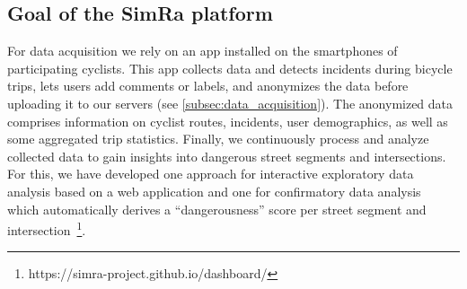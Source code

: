 \subsection{Goal of the SimRa platform}
\label{subsec:simra}

For data acquisition we rely on an app installed on the smartphones of participating cyclists.
This app collects data and detects incidents during bicycle trips, lets users add comments or labels, and anonymizes the data before uploading it to our servers (see \cref{subsec:data_acquisition}).
The anonymized data comprises information on cyclist routes, incidents, user demographics, as well as some aggregated trip statistics.
Finally, we continuously process and analyze collected data to gain insights into dangerous street segments and intersections.
For this, we have developed one approach for interactive exploratory data analysis based on a web application and one for confirmatory data analysis~\cite{bermbach2017cloud} which automatically derives a ``dangerousness'' score per street segment and intersection~\footnote{https://simra-project.github.io/dashboard/}.


